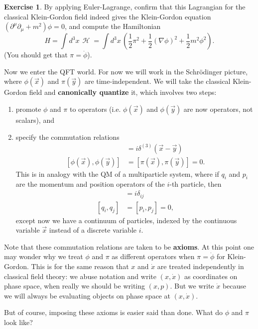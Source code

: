 \documentclass{report}
\theoremstyle{plain}
\theoremstyle{definition}
\newtheorem{exercise}{Exercise}[section]
\theoremstyle{remark}
\DeclareMathOperator{\cH}{\mathcal{H}}
\begin{document}
\begin{exercise}
  By applying Euler-Lagrange, confirm that this Lagrangian for the
  classical Klein-Gordon field indeed gives the Klein-Gordon equation
  $(\partial^\mu \partial_\mu + m^2)\phi = 0$, and compute the
  Hamiltonian
  $$ H = \int d^3x \, \cH = \int d^3x \, \left(\frac{1}{2} \pi^2 +
  \frac{1}{2}(\nabla \phi)^2 + \frac{1}{2} m^2\phi^2\right). $$ (You
  should get that $\pi = \dot \phi$).
\end{exercise}

Now we enter the QFT world. For now we will work in the Schr\"odinger
picture, where $\phi(\vec x)$ and $\pi(\vec y)$ are time-independent.
We will take the classical Klein-Gordon field and {\bf canonically
  quantize} it, which involves two steps:
\begin{enumerate}
\item promote $\phi$ and $\pi$ to operators (i.e. $\phi(\vec{x})$ and
  $\phi(\vec{y})$ are now operators, not scalars), and
\item specify the commutation relations
  \begin{align*}
    [\phi(\vec x),\pi(\vec y)] &= i\delta^{(3)}(\vec x-\vec y)\\
    [\phi(\vec x),\phi(\vec y)] &= [\pi(\vec x),\pi(\vec y)] = 0.
  \end{align*}
  This is in analogy with the QM of a multiparticle system, where if
  $q_i$ and $p_i$ are the momentum and position operators of the
  $i$-th particle, then
  \begin{align*}
    [q_i, p_j] &= i\delta_{ij}\\
    [q_i, q_j] &= [p_i, p_j] = 0,
  \end{align*}
  except now we have a continuum of particles, indexed by the
  continuous variable $\vec{x}$ instead of a discrete variable $i$.
\end{enumerate}
Note that these commutation relations are taken to be {\bf axioms}. At
this point one may wonder why we treat $\phi$ and $\pi$ as different
operators when $\pi = \dot\phi$ for Klein-Gordon. This is for the same
reason that $x$ and $\dot x$ are treated independently in classical
field theory: we abuse notation and write $(x, \dot x)$ as coordinates
on phase space, when really we should be writing $(x, p)$. But we
write $\dot x$ because we will always be evaluating objects on phase
space at $(x, \dot x)$.

But of course, imposing these axioms is easier said than done. What do
$\phi$ and $\pi$ look like?
\end{document}
